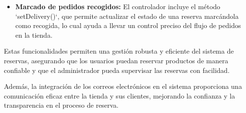 \begin{itemize}
\begin{itemize}
    \item \textbf{Marcado de pedidos recogidos: }El controlador incluye el método `setDelivery()`, que permite actualizar el estado de una reserva marcándola como recogida, lo cual ayuda a llevar un control preciso del flujo de pedidos en la tienda.
\end{itemize}

Estas funcionalidades permiten una gestión robusta y eficiente del sistema de reservas, asegurando que los usuarios puedan reservar productos de manera confiable y que el administrador pueda supervisar las reservas con facilidad.

\vspace{0.5cm}

Además, la integración de los correos electrónicos en el sistema proporciona una comunicación eficaz entre la tienda y sus clientes, mejorando la confianza y la transparencia en el proceso de reserva.

\end{itemize}


